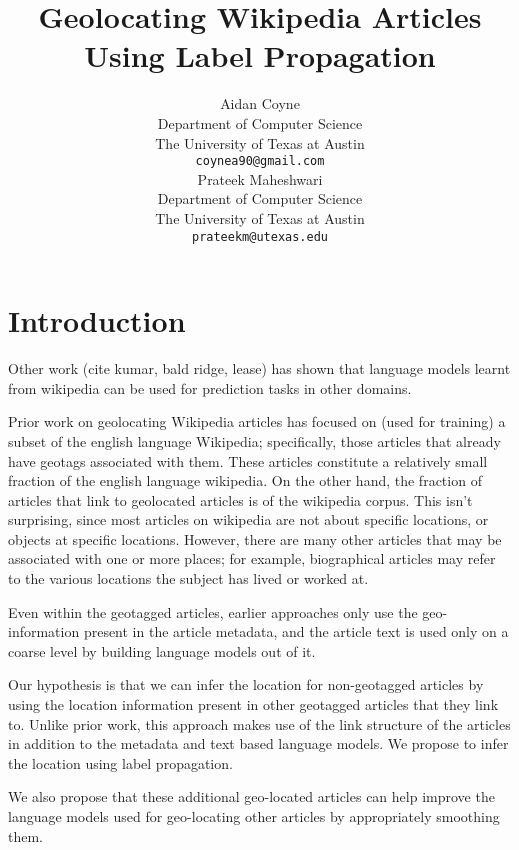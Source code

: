 \documentclass[11pt]{article}
\title{Geolocating Wikipedia Articles Using Label Propagation}
\author{
  Aidan Coyne \\
    Department of Computer Science\\
    The University of Texas at Austin\\
  {\tt coynea90@gmail.com} \\ 
  \And
  Prateek Maheshwari\\
    Department of Computer Science\\
    The University of Texas at Austin\\
  {\tt prateekm@utexas.edu}
}
\date{}
\begin{document}
\maketitle

\section{Introduction}
Other work (cite kumar, bald ridge, lease) has shown that language models learnt from wikipedia can be used for prediction tasks in other domains.

Prior work on geolocating Wikipedia articles has focused on (used for training) a subset of the english language Wikipedia; 
specifically, those articles that already have geotags associated with them. %
These articles constitute a relatively small fraction of the english language wikipedia. %
On the other hand, the fraction of articles that link to geolocated articles is %
of the wikipedia corpus. This isn't surprising, since most articles on wikipedia are not about specific locations, or objects at specific locations.
However, there are many other articles that may be associated with one or more places; 
for example, biographical articles may refer to the various locations the subject has lived or worked at.

Even within the geotagged articles, earlier approaches only use the geo-information present in the article metadata, and the article text is used only on a coarse level %
by building language models out of it.

Our hypothesis is that we can infer the location for non-geotagged articles 
by using the location information present in other geotagged articles that they link to. 
Unlike prior work, this approach makes use of the link structure of the articles in addition to the metadata and text based language models. 
We propose to infer the location using label propagation.

We also propose that these additional geo-located articles can help improve the language models used for geo-locating other articles by appropriately smoothing them.
\end{document}
